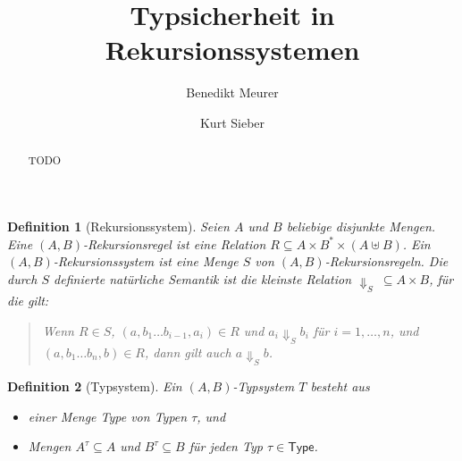 \documentclass[12pt,a2paper,draft]{article}
\newtheorem{definition}{Definition}
\begin{document}
\title{%
  Typsicherheit in Rekursionssystemen
}
\author{Benedikt Meurer}
\author{Kurt Sieber}
\date{}
\maketitle
\begin{abstract}
  TODO
\end{abstract}


\begin{definition}[Rekursionssystem]
  Seien $A$ und $B$ beliebige disjunkte Mengen. Eine \emph{$(A,B)$-Rekursionsregel}
  ist eine Relation $R \subseteq A \times B^* \times (A \uplus B)$. Ein
  \emph{$(A,B)$-Rekursionssystem} ist eine Menge $S$
  von $(A,B)$-Rekursionsregeln.
  Die durch $S$ definierte \emph{nat\"urliche Semantik} ist die kleinste Relation
  $\Downarrow_S\ \subseteq A \times B$, f\"ur die gilt:
  \begin{quote}
    Wenn $R \in S$, $(a,b_1 \ldots b_{i-1},a_i) \in R$ und
    $a_i \Downarrow_S b_i$ f\"ur $i=1,\ldots,n$, und $(a,b_1 \ldots b_n,b) \in R$,
    dann gilt auch $a \Downarrow_S b$.
  \end{quote}
\end{definition}

\begin{definition}[Typsystem]
  Ein \emph{$(A,B)$-Typsystem} $T$ besteht aus
  \begin{itemize}
  \item einer Menge \textsf{Type} von Typen $\tau$, und
  \item Mengen $A^\tau \subseteq A$ und $B^\tau \subseteq B$ f\"ur jeden Typ $\tau \in \textsf{Type}$.
  \end{itemize}
\end{definition}
\end{document}
